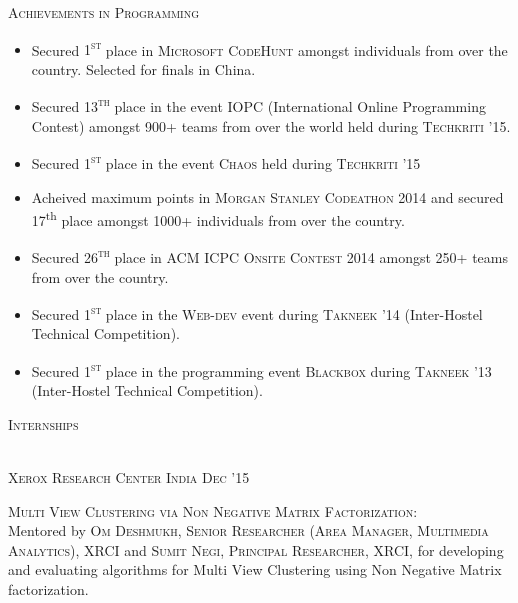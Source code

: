 \documentclass[10pt]{article}
\begin{document}
	{\centering\Large{\textsc{Achievements in Programming}} \hrulefill}

	\begin{itemize}
	\setlength\itemsep{-0.25em}
	\item Secured \textsc{1\textsuperscript{st}} place in \textsc{Microsoft CodeHunt} amongst individuals from over the country. Selected for finals in China.
	\item Secured \textsc{13\textsuperscript{th}} place in the event \textsc{IOPC} (International Online Programming Contest) amongst 900+ teams from over the world held during \textsc{Techkriti '15}.
	\item Secured \textsc{1\textsuperscript{st}} place in the event \textsc{Chaos} held during \textsc{Techkriti '15}
	\item
	Acheived maximum points in \textsc{Morgan Stanley Codeathon 2014} and secured 17\textsuperscript{th} place amongst 1000+ individuals from over the country.
	\item Secured \textsc{26\textsuperscript{th}} place in \textsc{ACM ICPC Onsite Contest} 2014 amongst \textsc{250+} teams from over the country.
	\item Secured \textsc{1\textsuperscript{st}} place in the \textsc{Web-dev} event during \textsc{Takneek '14} (Inter-Hostel Technical Competition).
	\item Secured \textsc{1\textsuperscript{st}} place in the programming event \textsc{Blackbox} during \textsc{Takneek '13} (Inter-Hostel Technical Competition).

	\end{itemize}
	
	{\centering\Large{\textsc{Internships}}	\hrulefill}
	
	\vspace{3mm}
	
	{}	\hfill{} \\
	\small\textsc{Xerox Research Center India}
	\hfill{\small{\textsc{Dec '15}}}
	
	\begin{changemargin}{1.0cm}{0.0cm} 
	{
	\large{\textsc{{Multi View Clustering via Non Negative Matrix Factorization:}}}  \\
	\small{Mentored by \textsc{Om Deshmukh, Senior Researcher (Area Manager, Multimedia Analytics), XRCI} and \textsc{Sumit Negi, Principal Researcher, XRCI}, for developing and evaluating algorithms for Multi View Clustering using Non Negative Matrix factorization.} 		
	}
	\end{changemargin} 	
	
\end{document}
